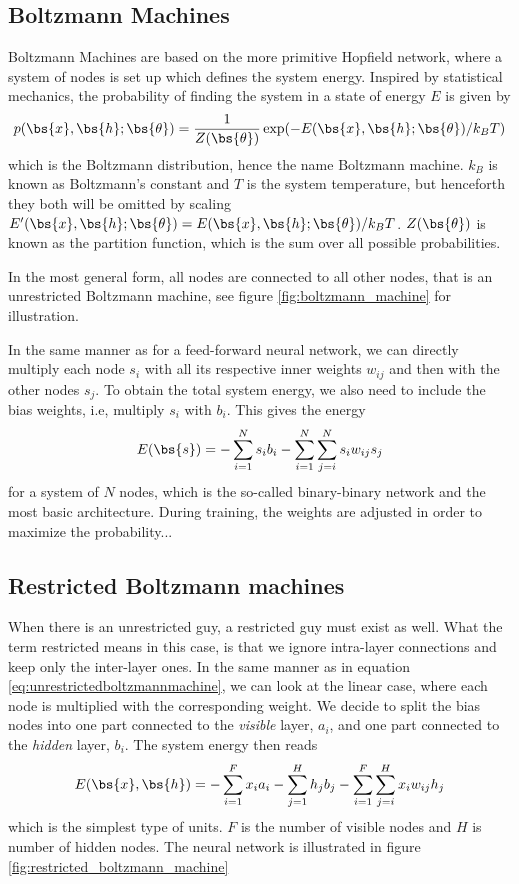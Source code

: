 \subsection{Boltzmann Machines}
Boltzmann Machines are based on the more primitive Hopfield network, where a system of nodes is set up which defines the system energy. Inspired by statistical mechanics, the probability of finding the system in a state of energy $E$ is given by
\begin{equation}
p(\bs{x},\bs{h};\bs{\theta})=\frac{1}{Z(\bs{\theta})}\exp(-E(\bs{x},\bs{h};\bs{\theta})/k_BT)
\end{equation}
which is the Boltzmann distribution, hence the name Boltzmann machine. $k_B$ is known as Boltzmann's constant and $T$ is the system temperature, but henceforth they both will be omitted by scaling $E'(\bs{x},\bs{h};\bs{\theta})=E(\bs{x},\bs{h};\bs{\theta})/k_BT$. $Z(\bs{\theta})$ is known as the partition function, which is the sum over all possible probabilities.

In the most general form, all nodes are connected to all other nodes, that is an unrestricted Boltzmann machine, see figure \eqref{fig:boltzmann_machine} for illustration. 



In the same manner as for a feed-forward neural network, we can directly multiply each node $s_i$ with all its respective inner weights $w_{ij}$ and then with the other nodes $s_j$. To obtain the total system energy, we also need to include the bias weights, i.e, multiply $s_i$ with $b_i$. This gives the energy
\begin{equation}
E(\bs{s})=- \sum_{i=1}^Ns_ib_i-\sum_{i=1}^N\sum_{j=i}^N s_iw_{ij}s_j 
\label{eq:unrestrictedboltzmannmachine}
\end{equation}
for a system of $N$ nodes, which is the so-called binary-binary network and the most basic architecture. During training, the weights are adjusted in order to maximize the probability...

\subsection{Restricted Boltzmann machines}
When there is an unrestricted guy, a restricted guy must exist as well. What the term restricted means in this case, is that we ignore intra-layer connections and keep only the inter-layer ones. In the same manner as in equation \eqref{eq:unrestrictedboltzmannmachine}, we can look at the linear case, where each node is multiplied with the corresponding weight. We decide to split the bias nodes into one part connected to the \textit{visible} layer, $a_i$, and one part connected to the \textit{hidden} layer, $b_i$. The system energy then reads
\begin{equation}
E(\bs{x},\bs{h})=- \sum_{i=1}^Fx_ia_i- \sum_{j=1}^Hh_jb_j-\sum_{i=1}^F\sum_{j=i}^H x_iw_{ij}h_j 
\label{eq:binarybinary}
\end{equation}
which is the simplest type of units. $F$ is the number of visible nodes and $H$ is number of hidden nodes. The neural network is illustrated in figure \eqref{fig:restricted_boltzmann_machine}

